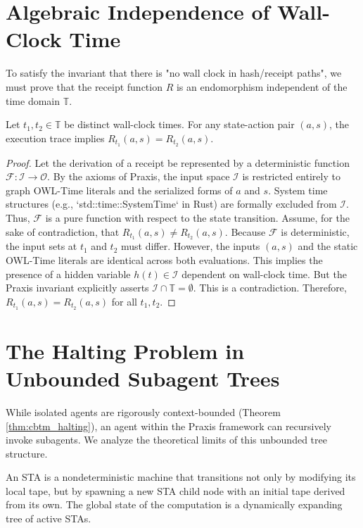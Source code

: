 \section{Algebraic Independence of Wall-Clock Time}

To satisfy the invariant that there is "no wall clock in hash/receipt paths", we must prove that the receipt function $R$ is an endomorphism independent of the time domain $\mathbb{T}$.

\begin{theorem}
\label{thm:temporal_independence}
Let $t_1, t_2 \in \mathbb{T}$ be distinct wall-clock times. For any state-action pair $(a, s)$, the execution trace implies $R_{t_1}(a, s) = R_{t_2}(a, s)$.
\end{theorem}

\begin{proof}
Let the derivation of a receipt be represented by a deterministic function $\mathcal{F}: \mathcal{I} \rightarrow \mathcal{O}$. By the axioms of Praxis, the input space $\mathcal{I}$ is restricted entirely to graph OWL-Time literals and the serialized forms of $a$ and $s$. System time structures (e.g., `std::time::SystemTime` in Rust) are formally excluded from $\mathcal{I}$. 
Thus, $\mathcal{F}$ is a pure function with respect to the state transition. 
Assume, for the sake of contradiction, that $R_{t_1}(a, s) \neq R_{t_2}(a, s)$. Because $\mathcal{F}$ is deterministic, the input sets at $t_1$ and $t_2$ must differ. However, the inputs $(a, s)$ and the static OWL-Time literals are identical across both evaluations. This implies the presence of a hidden variable $h(t) \in \mathcal{I}$ dependent on wall-clock time. But the Praxis invariant explicitly asserts $\mathcal{I} \cap \mathbb{T} = \emptyset$. This is a contradiction. 
Therefore, $R_{t_1}(a, s) = R_{t_2}(a, s)$ for all $t_1, t_2$.
\end{proof}

\section{The Halting Problem in Unbounded Subagent Trees}

While isolated agents are rigorously context-bounded (Theorem \ref{thm:cbtm_halting}), an agent within the Praxis framework can recursively invoke subagents. We analyze the theoretical limits of this unbounded tree structure.

\begin{definition}
An STA is a nondeterministic machine that transitions not only by modifying its local tape, but by spawning a new STA child node with an initial tape derived from its own. The global state of the computation is a dynamically expanding tree of active STAs.
\end{definition}

